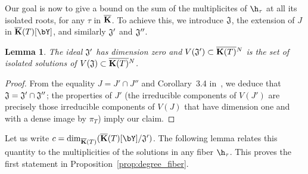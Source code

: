 \documentclass[12pt]{article}
\newtheorem{lemma}[definition]{Lemma}
\begin{document}

Our goal is now to give a bound on the sum of the multiplicites of
$\h_\tau$ at all its isolated roots, for any $\tau$ in $\overline{\mathbf{K}}$.  To
achieve this, we introduce $\frak{J}$, the extension of $J$ in
$\KKbar(T)[\bY]$, and similarly $\frak{J}'$ and ${\frak J}''$.

\begin{lemma}
  The ideal $\frak{J}'$ has dimension zero and $V(\frak{J}') \subset
  \overline{\mathbf{K}(T)}{}^N$ is the set of isolated solutions of
  $V(\frak{J}) \subset \overline{\mathbf{K}(T)}{}^N$.
\end{lemma}
\begin{proof}
 From the equality $J=J' \cap J''$ and Corollary~3.4 in~\cite{AtMc},
 we deduce that $\frak{J}=\frak{J'} \cap \frak{J''}$; the properties
 of $J'$ (the irreducible components of $V(J')$ are precisely those
 irreducible components of $V(J)$ that have dimension one and with a
 dense image by $\pi_T$) imply our claim.
\end{proof}


Let us write $c=\dim_{\KKbar(T)}(\KKbar(T)[\bY]/{\frak J}')$.  The
following lemma relates this quantity to the multiplicities of the
solutions in any fiber $\h_\tau$. This proves the first statement
in Proposition~\ref{prop:degree_fiber}.
\end{document}
